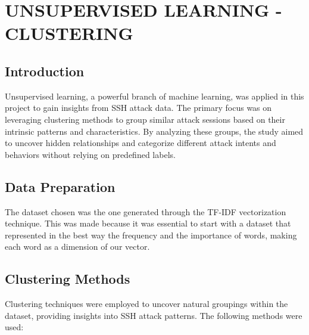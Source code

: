 

\section{UNSUPERVISED LEARNING - CLUSTERING}


    \subsection{Introduction}
    Unsupervised learning, a powerful branch of machine learning, was applied in this project to gain insights from SSH attack data. The primary focus was on leveraging clustering methods to group similar attack sessions based on their intrinsic patterns and characteristics. By analyzing these groups, the study aimed to uncover hidden relationships and categorize different attack intents and behaviors without relying on predefined labels. 
    
    \subsection{Data Preparation}
    
        The dataset chosen was the one generated through the TF-IDF vectorization technique. This was made because it was essential to start with a dataset that represented in the best way the frequency and the importance of words, making each word as a dimension of our vector.

    \subsection{Clustering Methods}
    
        Clustering techniques were employed to uncover natural groupings within the dataset, providing insights into SSH attack patterns. The following methods were used:

